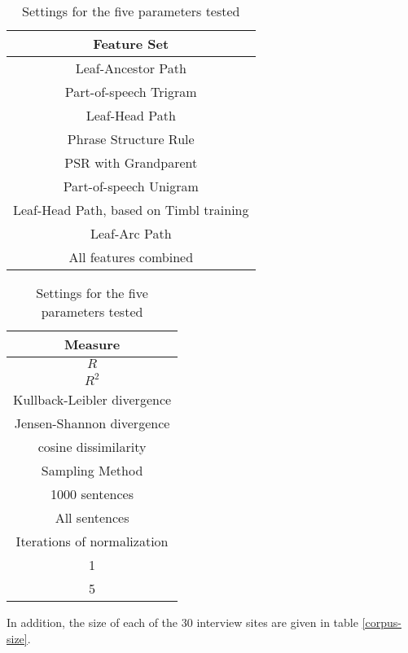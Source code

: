 \begin{table}
\begin{tabular}{|c|} \hline
  Feature Set \\\hline
  Leaf-Ancestor Path \\
  Part-of-speech Trigram \\
  Leaf-Head Path \\
  Phrase Structure Rule \\
  PSR with Grandparent \\
  Part-of-speech Unigram \\
  Leaf-Head Path, based on Timbl training \\
  Leaf-Arc Path \\
  All features combined \\ \hline
\end{tabular}
\begin{tabular}{|c|} \hline
  Measure \\ \hline
  $R$ \\
  $R^2$ \\
  Kullback-Leibler divergence \\
  Jensen-Shannon divergence \\
  cosine dissimilarity\\\hline \hline
  Sampling Method \\ \hline
  1000 sentences \\
  All sentences \\ \hline \hline
  Iterations of normalization \\ \hline
  1 \\
  5 \\ \hline
\end{tabular}
\vspace{5mm}
\caption{Settings for the five parameters tested}
\label{parameter-settings}
\end{table}

In addition, the size of each of the 30 interview sites are given in
table \ref{corpus-size}.

